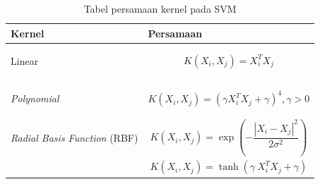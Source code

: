 \begin{table}[H]
	\caption{Tabel persamaan kernel pada SVM}
	\centering
	\small
	\begin{adjustbox}{width=1\textwidth}
	\begin{tabular}{|p{4.55cm}|p{8.55cm}|}
		\hline
		\textbf{Kernel} & \textbf{Persamaan}\\
		\hline
		
		\begin{center}
			Linear
		\end{center} &
		\vspace{-0.7cm}
		\begin{equation}\label{eqn:kernel-linear}
		K(X_i,X_j)=X_i^T X_j
		\end{equation}\\
		\hline
		
		\begin{center}
			\textit{Polynomial}
		\end{center}&
		\vspace{-0.7cm}
		\begin{equation}
		K(X_i,X_j)=(\gamma X_i^T X_j+\gamma)^4,\gamma>0
		\end{equation}\\
		\hline
		
		\begin{center}
			\textit{Radial Basis Function} (RBF)
		\end{center}&
		\vspace{-0.7cm}
		\begin{equation}
		K(X_i,X_j)=\exp(-\frac{|X_i-X_j|^2}{2\sigma^2})
		\end{equation}\\
		
		\hline
		\textit{\begin{center}
				Sigmoid
			\end{center}}&
			\vspace{-0.7cm}
		\begin{equation}
		K(X_i,X_j)=\tanh(\gamma\ X_i^T X_j+\gamma)
		\end{equation}\\
		\hline
	\end{tabular}
	\end{adjustbox}
\end{table}

